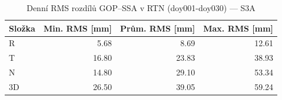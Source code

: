\begin{table}[H]
\centering
\caption{Denní RMS rozdílů GOP–SSA v RTN (doy001-doy030) — S3A}
\label{tab:as_ZAZG_doy001-doy030_rms}
\begin{tabular}{lrrr}
\toprule
Složka & Min. RMS [mm] & Prům. RMS [mm] & Max. RMS [mm] \\
\midrule
R & 5.68 & 8.69 & 12.61 \\
T & 16.80 & 23.83 & 38.93 \\
N & 14.80 & 29.10 & 53.34 \\
3D & 26.50 & 39.05 & 59.24 \\
\bottomrule
\end{tabular}
\end{table}
